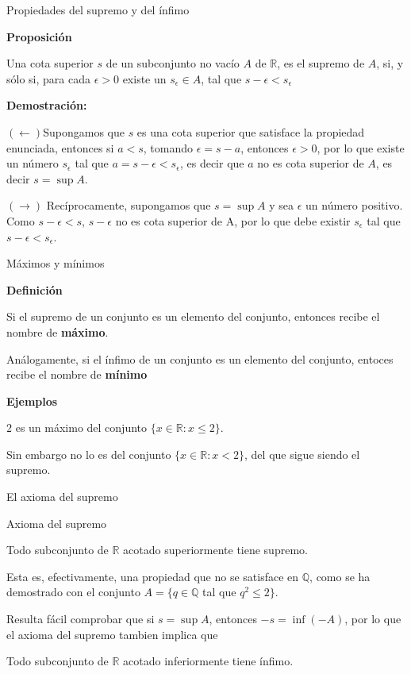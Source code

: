 \documentclass[
  ignorenonframetext,
]{beamer}
\begin{document}
\begin{frame}{Propiedades del supremo y del ínfimo}
\protect\hypertarget{propiedades-del-supremo-y-del-uxednfimo-1}{}

\textbf{Proposición}

Una cota superior \(s\) de un subconjunto no vacío \(A\) de
\(\mathbb{R}\), es el supremo de \(A\), si, y sólo si, para cada
\(\epsilon >0\) existe un \(s_{\epsilon} \in A\), tal que
\(s-\epsilon < s_\epsilon\)

\textbf{Demostración:}

\((\leftarrow)\)Supongamos que \(s\) es una cota superior que satisface
la propiedad enunciada, entonces si \(a<s\), tomando \(\epsilon = s-a\),
entonces \(\epsilon >0\), por lo que existe un número \(s_{\epsilon}\)
tal que \(a=s-\epsilon < s_{\epsilon}\), es decir que \(a\) no es cota
superior de \(A\), es decir \(s=\sup A\).

\((\rightarrow)\) Recíprocamente, supongamos que \(s = \sup A\) y sea
\(\epsilon\) un número positivo. Como \(s-\epsilon <s\), \(s-\epsilon\)
no es cota superior de A, por lo que debe existir \(s_{\epsilon}\) tal
que \(s-\epsilon < s_{\epsilon}\).

\end{frame}

\begin{frame}{Máximos y mínimos}
\protect\hypertarget{muxe1ximos-y-muxednimos}{}

\textbf{Definición}

Si el supremo de un conjunto es un elemento del conjunto, entonces
recibe el nombre de \textbf{máximo}.

Análogamente, si el ínfimo de un conjunto es un elemento del conjunto,
entoces recibe el nombre de \textbf{mínimo}

\textbf{Ejemplos}

\(2\) es un máximo del conjunto \(\{x \in \mathbb{R}: x \leq 2 \}\).

Sin embargo no lo es del conjunto \(\{x \in \mathbb{R}: x < 2 \}\), del
que sigue siendo el supremo.

\end{frame}

\begin{frame}{El axioma del supremo}
\protect\hypertarget{el-axioma-del-supremo}{}

Axioma del supremo

Todo subconjunto de \(\mathbb{R}\) acotado superiormente tiene supremo.

Esta es, efectivamente, una propiedad que no se satisface en
\(\mathbb{Q}\), como se ha demostrado con el conjunto
\(A =\{q \in \mathbb{Q}\) tal que \(q^2 \leq 2 \}\).

Resulta fácil comprobar que si \(s= \sup A\), entonces \(-s= \inf(-A)\),
por lo que el axioma del supremo tambien implica que

Todo subconjunto de \(\mathbb{R}\) acotado inferiormente tiene ínfimo.

\end{frame}
\end{document}
